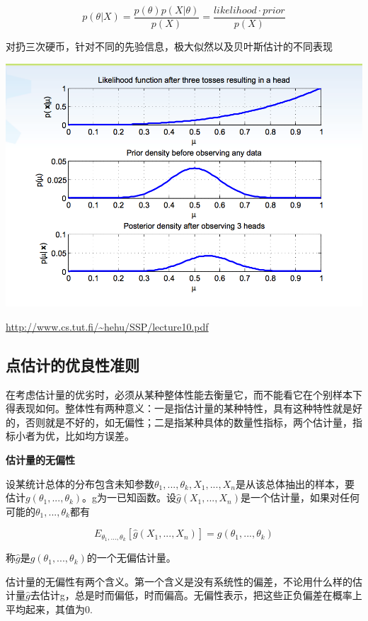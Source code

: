 \documentclass{ctexart}
\begin{document}
	\[p(\theta|X)=\frac{p(\theta)p(X|\theta)}{p(X)}=\frac{likelihood·prior}{p(X)}\]
	
	对扔三次硬币，针对不同的先验信息，极大似然以及贝叶斯估计的不同表现
	
	\includegraphics[width=1\linewidth]{pic/prior_and_posterior}
	
	\url{http://www.cs.tut.fi/~hehu/SSP/lecture10.pdf}
	
	
	\subsection{点估计的优良性准则}
	
	在考虑估计量的优劣时，必须从某种整体性能去衡量它，而不能看它在个别样本下得表现如何。整体性有两种意义：一是指估计量的某种特性，具有这种特性就是好的，否则就是不好的，如无偏性；二是指某种具体的数量性指标，两个估计量，指标小者为优，比如均方误差。
	
	\mbox{}
	
	\textbf{估计量的无偏性}
	
	设某统计总体的分布包含未知参数\(\theta_1,...,\theta_k, X_1,...,X_n\)是从该总体抽出的样本，要估计\(g(\theta_1,...,\theta_k)\)。g为一已知函数。设\(\hat{g}(X_1,...,X_n)\)是一个估计量，如果对任何可能的\(\theta_1,...,\theta_k\)都有
	
	\[E_{\theta_1,...,\theta_k}[\hat{g}(X_1,...,X_n)] = g(\theta_1,...,\theta_k)\]
	
	称\(\hat{g}\)是\(g(\theta_1,...,\theta_k)\)的一个无偏估计量。
	
	估计量的无偏性有两个含义。第一个含义是没有系统性的偏差，不论用什么样的估计量\(\hat{g}\)去估计g，总是时而偏低，时而偏高。无偏性表示，把这些正负偏差在概率上平均起来，其值为0.
	
\end{document}
